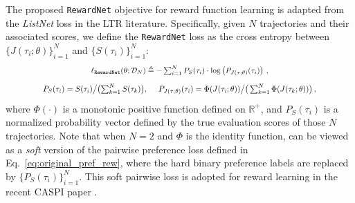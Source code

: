 The proposed \texttt{RewardNet} objective for reward function learning is adapted from the \textit{ListNet} loss \citep{listnet2007} in the LTR literature. 
Specifically, given $N$ trajectories and their associated scores, we 
define the \texttt{RewardNet} loss as the cross entropy between $\{J(\tau_i; \theta)\}_{i=1}^{N}$ and $\{S(\tau_i)\}_{i=1}^{N}$:
\begin{equation}\label{eq:listnet}\textstyle
\resizebox{.53\linewidth}{!}{%
$
   \ell_{\texttt{RewardNet}}(\theta; \gD_{N} ) \triangleq - \sum_{i=1}^{N} P_{S}(\tau_i)\cdot \log\left( P_{J(\tau ; \theta)}(\tau_i)\right)\,,
    $%
}
\end{equation}
\begin{equation*}
\resizebox{.82\linewidth}{!}{%
$
   P_{S}(\tau_i) = {S(\tau_i)} \big/ \big({\sum_{k=1}^{N} S(\tau_k)}\big),~~~~ P_{J(\tau ; \theta)}(\tau_i) = {\Phi(J(\tau_i; \theta))}\big/ \big(\sum_{k=1}^{N}\Phi(J(\tau_k; \theta))\big)\,,
    $%
}
\end{equation*}
where $\Phi(\cdot)$ is a monotonic positive function defined on $\mathbb{R}^{+}$, 
and $P_{S}(\tau_i)$ is a normalized probability vector defined by the true evaluation scores of those $N$ trajectories. 
Note that when $N=2$ and $\Phi$ is the identity function, \rewardnet can be viewed as a \textit{soft} version of the pairwise preference loss defined in Eq.~\eqref{eq:original_pref_rew}, where the hard binary preference labels are replaced by $\{P_{S}(\tau_i)\}_{i=1}^{N}$. 
This soft pairwise loss is adopted for reward learning in the recent CASPI paper \citep{caspi2021}.


